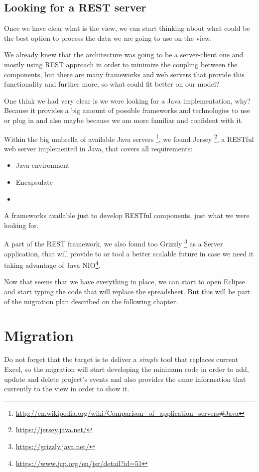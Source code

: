\section{Looking for a REST server}
Once we have clear what is the view, we can start thinking about what could be
the best option to process the data we are going to use on the view.

We already knew that the architecture was going to be a server-client one and
mostly using REST approach in order to minimize the coupling between the
components, but there are many frameworks and web servers that provide this
functionality and further more, so what could fit better on our model?

One think we had very clear is we were looking for a Java implementation, why?
Because it provides a big amount of possible frameworks and technologies to
use or plug in and also maybe because we am more familiar and confident
with it.

Within the big umbrella of available Java servers
\footnote{\url{http://en.wikipedia.org/wiki/Comparison\_of\_application\_servers\#Java}},
we found Jersey \footnote{\url{https://jersey.java.net/}}, a RESTful web server
implemented in Java, that covers all requirements:
\begin{itemize}
  \item Java environment
  \item Encapsulate 
  \item 
\end{itemize}
A frameworks
available just to develop RESTful components, just what we were looking for.

A part of the REST framework, we also found too Grizzly
\footnote{\url{https://grizzly.java.net/}} as a Server application, that will
provide to or tool a better scalable future in case we need it taking
advantage of Java NIO\footnote{\url{https://www.jcp.org/en/jsr/detail?id=51}}.

Now that seems that we have everything in place, we can start to open Eclipse
and start typing the code that will replace the spreadsheet. But this will be
part of the migration plan described on the following chapter.

\chapter{Migration}
Do not forget that the target is to deliver a \emph{simple} tool that replaces
current Excel, so the migration will start developing the minimum code in order
to add, update and delete project's events and also provides the same
information that currently to the view in order to show it.

